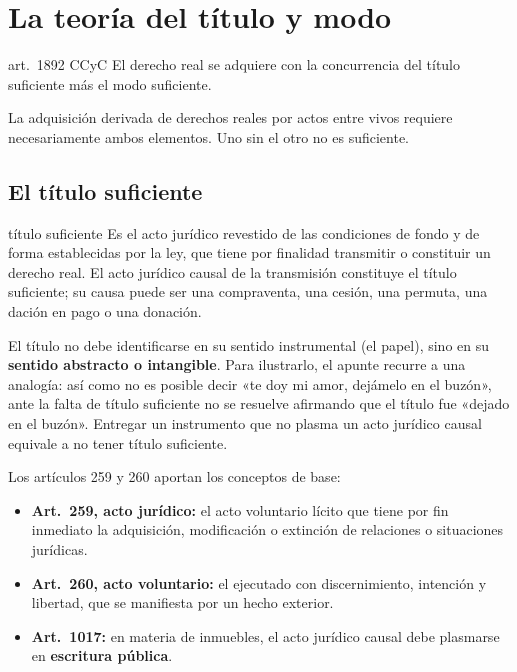 \documentclass[12pt,oneside]{book}
\begin{document}
\section{La teoría del título y modo}

\begin{regla}{art.~1892 CCyC}
El derecho real se adquiere con la concurrencia del título suficiente más el modo suficiente.
\end{regla}

La adquisición derivada de derechos reales por actos entre vivos requiere necesariamente ambos elementos. Uno sin el otro no es suficiente.

\subsection{El título suficiente}

\begin{definicion}{título suficiente}
Es el acto jurídico revestido de las condiciones de fondo y de forma establecidas por la ley, que tiene por finalidad transmitir o constituir un derecho real. El acto jurídico causal de la transmisión constituye el título suficiente; su causa puede ser una compraventa, una cesión, una permuta, una dación en pago o una donación.
\end{definicion}

El título no debe identificarse en su sentido instrumental (el papel), sino en su \textbf{sentido abstracto o intangible}. Para ilustrarlo, el apunte recurre a una analogía: así como no es posible decir «te doy mi amor, dejámelo en el buzón», ante la falta de título suficiente no se resuelve afirmando que el título fue «dejado en el buzón». Entregar un instrumento que no plasma un acto jurídico causal equivale a no tener título suficiente.

Los artículos 259 y 260 aportan los conceptos de base:

\begin{itemize}
    \item \textbf{Art.~259, acto jurídico:} el acto voluntario lícito que tiene por fin inmediato la adquisición, modificación o extinción de relaciones o situaciones jurídicas.
    \item \textbf{Art.~260, acto voluntario:} el ejecutado con discernimiento, intención y libertad, que se manifiesta por un hecho exterior.
    \item \textbf{Art.~1017:} en materia de inmuebles, el acto jurídico causal debe plasmarse en \textbf{escritura pública}.
\end{itemize}
\end{document}
